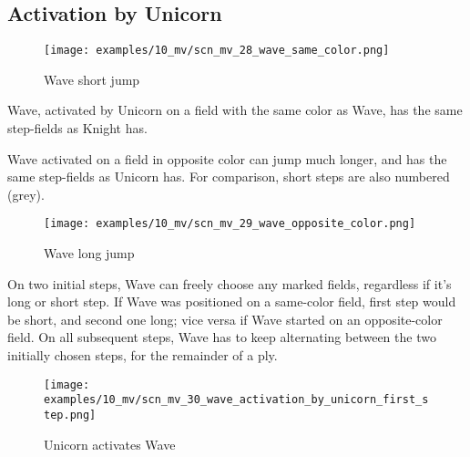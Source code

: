 \subsection*{Activation by Unicorn}

\vspace*{-1.1\baselineskip}
\noindent
\begin{wrapfigure}[10]{l}{0.45\textwidth}
\centering
\texttt{[image: examples/10\_mv/scn\_mv\_28\_wave\_same\_color.png]}
\vspace*{-0.7\baselineskip}
\caption{Wave short jump}
\label{fig:scn_mv_28_wave_same_color}
\end{wrapfigure}
Wave, activated by Unicorn on a field with the same color as Wave, has the same step-fields
as Knight has.

Wave activated on a field in opposite color can jump much longer, and has the same step-fields
as Unicorn has. For comparison, short steps are also numbered (grey).

\vspace*{0.3\baselineskip}
\noindent
\begin{wrapfigure}[18]{l}{0.7\textwidth}
\centering
\texttt{[image: examples/10\_mv/scn\_mv\_29\_wave\_opposite\_color.png]}
\vspace*{-0.7\baselineskip}
\caption{Wave long jump}
\label{fig:scn_mv_29_wave_opposite_color}
\end{wrapfigure}
On two initial steps, Wave can freely choose any marked fields, regardless if it's long or short step.
If Wave was positioned on a same-color field, first step would be short, and second one long; vice versa
if Wave started on an opposite-color field. On all subsequent steps, Wave has to keep alternating between
the two initially chosen steps, for the remainder of a ply.

\clearpage %

\vspace*{-2.7\baselineskip}
\noindent
\begin{figure}[!h]
\texttt{[image: examples/10\_mv/scn\_mv\_30\_wave\_activation\_by\_unicorn\_first\_step.png]}
\caption{Unicorn activates Wave}
\label{fig:scn_mv_30_wave_activation_by_unicorn_first_step}
\end{figure}

